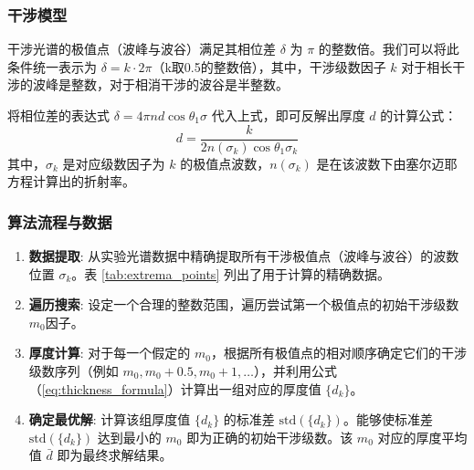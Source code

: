 \documentclass[a4paper]{ctexart}
\begin{document}
\subsubsection{干涉模型}


干涉光谱的极值点（波峰与波谷）满足其相位差 $\delta$ 为 $\pi$ 的整数倍。我们可以将此条件统一表示为 $\delta = k \cdot 2\pi$（k取0.5的整数倍），其中，干涉级数因子 $k$ 对于相长干涉的波峰是整数，对于相消干涉的波谷是半整数。

将相位差的表达式 $\delta = 4\pi n d \cos\theta_1 \sigma$ 代入上式，即可反解出厚度 $d$ 的计算公式：
\begin{equation}
    d = \frac{k}{2 n(\sigma_k) \cos\theta_1 \sigma_k}
    \label{eq:thickness_formula}
\end{equation}
其中，$\sigma_k$ 是对应级数因子为 $k$ 的极值点波数，$n(\sigma_k)$ 是在该波数下由塞尔迈耶方程计算出的折射率。

\subsubsection{算法流程与数据}
\begin{enumerate}
    \item \textbf{数据提取}: 从实验光谱数据中精确提取所有干涉极值点（波峰与波谷）的波数位置 $\sigma_k$。表 \ref{tab:extrema_points} 列出了用于计算的精确数据。
    \item \textbf{遍历搜索}: 设定一个合理的整数范围，遍历尝试第一个极值点的初始干涉级数 $m_0$因子。
    \item \textbf{厚度计算}: 对于每一个假定的 $m_0$，根据所有极值点的相对顺序确定它们的干涉级数序列（例如 $m_0, m_0+0.5, m_0+1, \dots$），并利用公式（\ref{eq:thickness_formula}）计算出一组对应的厚度值 $\{d_k\}$。 
    \item \textbf{确定最优解}: 计算该组厚度值 $\{d_k\}$ 的标准差 $\text{std}(\{d_k\})$。能够使标准差 $\text{std}(\{d_k\})$ 达到最小的 $m_0$ 即为正确的初始干涉级数。该 $m_0$ 对应的厚度平均值 $\bar{d}$ 即为最终求解结果。
\end{enumerate}
\end{document}
